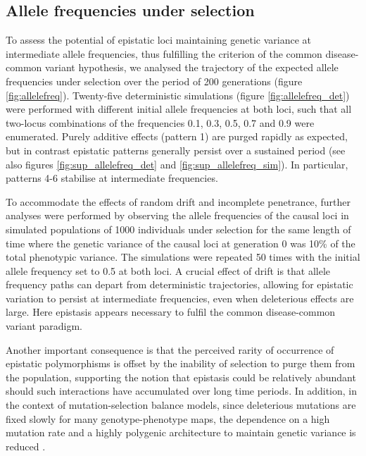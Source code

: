 \subsection{Allele frequencies under selection}

To assess the potential of epistatic loci maintaining genetic variance at intermediate allele frequencies, thus fulfilling the criterion of the common disease-common variant hypothesis, we analysed the trajectory of the expected allele frequencies under selection over the period of 200 generations (figure \ref{fig:allelefreq}). Twenty-five deterministic simulations (figure \ref{fig:allelefreq_det}) were performed with different initial allele frequencies at both loci, such that all two-locus combinations of the frequencies 0.1, 0.3, 0.5, 0.7 and 0.9 were enumerated. Purely additive effects (pattern 1) are purged rapidly as expected, but in contrast epistatic patterns generally persist over a sustained period (see also figures \ref{fig:sup_allelefreq_det} and \ref{fig:sup_allelefreq_sim}). In particular, patterns 4-6 stabilise at intermediate frequencies.

To accommodate the effects of random drift and incomplete penetrance, further analyses were performed by observing the allele frequencies of the causal loci in simulated populations of 1000 individuals under selection for the same length of time where the genetic variance of the causal loci at generation 0 was 10\% of the total phenotypic variance. The simulations were repeated 50 times with the initial allele frequency set to 0.5 at both loci. A crucial effect of drift is that allele frequency paths can depart from deterministic trajectories, allowing for epistatic variation to persist at intermediate frequencies, even when deleterious effects are large. Here epistasis appears necessary to fulfil the common disease-common variant paradigm. 

Another important consequence is that the perceived rarity of occurrence of epistatic polymorphisms is offset by the inability of selection to purge them from the population, supporting the notion that epistasis could be relatively abundant should such interactions have accumulated over long time periods. In addition, in the context of mutation-selection balance models, since deleterious mutations are fixed slowly for many genotype-phenotype maps, the dependence on a high mutation rate and a highly polygenic architecture to maintain genetic variance is reduced \citep{Phillips2007}.

